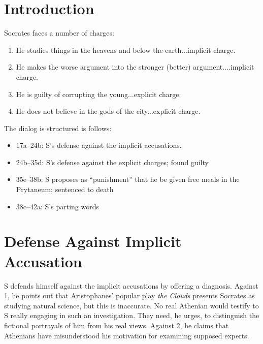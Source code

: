 \documentclass[oneside]{article}
\begin{document}
\thispagestyle{fancy}

\section*{Introduction}

Socrates faces a number of charges:

\begin{enumerate}
\item He studies things in the heavens and below the earth...implicit charge.
\item He makes the worse argument into the stronger (better) argument....implicit charge.
\item He is guilty of corrupting the young...explicit charge.
\item He does not believe in the gods of the city...explicit charge.
\end{enumerate}
The dialog is structured is follows: 

\begin{itemize}
\item 17a--24b: S's defense against the implicit accusations. 
\item 24b--35d: S's defense against the explicit charges; found guilty
\item  35e--38b: S proposes as ``punishment'' that he be given free meals in the Prytaneum; sentenced to death
\item 38c--42a: S's parting words
\end{itemize}

\section*{Defense Against Implicit Accusation}
S defends himself against the implicit  accusations by offering a diagnosis. Against 1, he points out that Aristophanes' popular play \emph{the Clouds} presents Socrates as studying natural science, but this is inaccurate. No real Athenian would testify to S really engaging in such an investigation. They need, he urges, to distinguish the fictional portrayals of him from his real views. Against 2, he claims that Athenians have misunderstood his motivation for examining supposed experts. 
\end{document}
